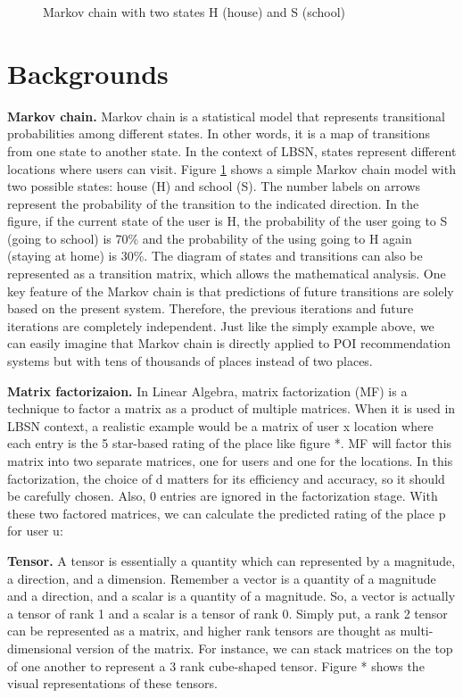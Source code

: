 \documentclass{sig-alternate}
\begin{document}
\begin{figure}
\centering
{}
\caption{Markov chain with two states H (house) and S (school)}
\label{fig:MarkovChain}
\end{figure}

\section{Backgrounds}
\label{sec:backgrounds}

\textbf{Markov chain.} Markov chain is a statistical model that represents transitional probabilities among different states. 
In other words, it is a map of transitions from one state to another state. In the context of LBSN, 
states represent different locations where users can visit. Figure \ref{fig:MarkovChain} shows a simple Markov chain 
model with two possible states: house (H) and school (S). The number labels on arrows represent 
the probability of the transition to the indicated direction. In the figure, if the current state of the 
user is H, the probability of the user going to S (going to school) is 70\% and the probability of the 
using going to H again (staying at home) is 30\%. The diagram of states and transitions can also be 
represented as a transition matrix, which allows the mathematical analysis. One key 
feature of the Markov chain is that predictions of future transitions are solely based on the present 
system. Therefore, the previous iterations and future iterations are completely independent. 
Just like the simply example above, we can easily imagine that Markov chain is directly applied to 
POI recommendation systems but with tens of thousands of places instead of two places.

\textbf{Matrix factorizaion.} In Linear Algebra, matrix factorization (MF) is a technique to factor a matrix as a product of multiple matrices. 
When it is used in LBSN context, a realistic example would be a matrix of user x location 
where each entry is the 5 star-based rating of the place like figure *. MF will factor this matrix 
into two separate matrices, one for users and one for the locations. In this factorization, the 
choice of d matters for its efficiency and accuracy, so it should be carefully chosen. Also, 0 
entries are ignored in the factorization stage. With these two factored matrices, we can 
calculate the predicted rating of the place p for user u: 

\textbf{Tensor.} A tensor is essentially a quantity which can represented by a magnitude, a direction, and 
a dimension. Remember a vector is a quantity of a magnitude and a direction, and a scalar 
is a quantity of a magnitude. So, a vector is actually a tensor of rank 1 and a scalar is a tensor 
of rank 0. Simply put, a rank 2 tensor can be represented as a matrix, and higher rank tensors 
are thought as multi-dimensional version of the matrix. For instance, we can stack matrices on 
the top of one another to represent a 3 rank cube-shaped tensor. Figure * shows the visual representations of these tensors.
\end{document}
